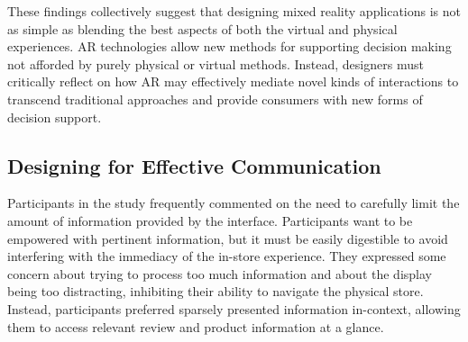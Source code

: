 These findings collectively suggest that designing mixed reality applications is not as simple as blending the best aspects of both the virtual and physical experiences. AR technologies allow new methods for supporting decision making not afforded by purely physical or virtual methods. Instead, designers must critically reflect on how AR may effectively mediate novel kinds of interactions to transcend traditional approaches and provide consumers with new forms of decision support. 

\subsection{Designing for Effective Communication}
Participants in the study frequently commented on the need to carefully limit the amount of information provided by the interface. Participants want to be empowered with pertinent information, but it must be easily digestible to avoid interfering with the immediacy of the in-store experience. They expressed some concern about trying to process too much information and about the display being too distracting, inhibiting their ability to navigate the physical store. Instead, participants preferred sparsely presented information in-context, allowing them to access relevant review and product information at a glance. 


